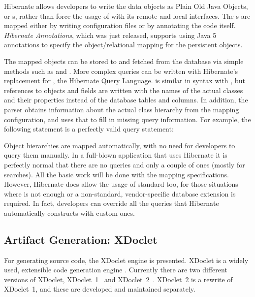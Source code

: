 Hibernate allows developers to write the data objects as Plain Old 
Java Objects, or s, rather than force the usage of 
 with its remote and local interfaces. The s 
are mapped either by writing configuration files or by annotating the 
code itself. \textsl{Hibernate Annotations}, which was just released, 
supports using Java 5 annotations to specify the object/relational 
mapping for the persistent objects.

The mapped objects can be stored to and fetched from the database via 
simple methods such as  and 
. More complex queries can be 
written with Hibernate's replacement for , the Hibernate 
Query Language.  is similar in syntax with , 
but references to objects and fields are written with the names of the 
actual classes and their properties instead of the database tables and 
columns. In addition, the  parser obtains information 
about the actual class hierarchy from the mapping configuration, and 
uses that to fill in missing query information. For example, the 
following statement is a perfectly valid  query statement:

\begin{quote}
\end{quote}

Object hierarchies are mapped automatically, with no need for 
developers to query them manually. In a full-blown application that 
uses Hibernate it is perfectly normal that there are no  
queries and only a couple of  ones (mostly for searches). 
All the basic work will be done with the mapping specifications. 
However, Hibernate does allow the usage of standard  too, 
for those situations where  is not enough or a 
non-standard, vendor-specific database extension is required. In fact, 
developers can override all the queries that Hibernate automatically 
constructs with custom  ones.



\subsection{Artifact Generation: XDoclet}
\label{toc:oss:selected:xdoclet}

For generating source code, the XDoclet engine is presented. XDoclet 
is a widely used, extensible code generation engine 
\citep{aspectizing}. Currently there are two different versions of 
XDoclet, XDoclet~1~\citep{xdoclet1} and XDoclet~2~\citep{xdoclet2}. 
XDoclet~2 is a rewrite of XDoclet~1, and these are developed and 
maintained separately.

